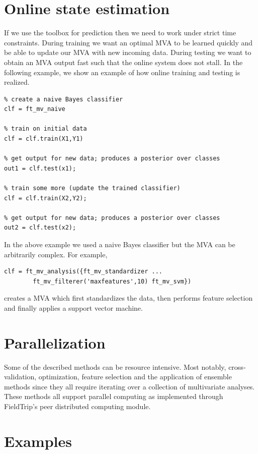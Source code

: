\documentclass{article}
\begin{document}


\section{Online state estimation}

If we use the toolbox for prediction then we need to work under strict time constraints. During training we want an optimal MVA to be learned quickly and be able to update our MVA with new incoming data. During testing we want to obtain an MVA output fast such that the online system does not stall. In the following example, we show an example of how online training and testing is realized.
\begin{verbatim}
% create a naive Bayes classifier
clf = ft_mv_naive

% train on initial data
clf = clf.train(X1,Y1)

% get output for new data; produces a posterior over classes
out1 = clf.test(x1);

% train some more (update the trained classifier)
clf = clf.train(X2,Y2);

% get output for new data; produces a posterior over classes
out2 = clf.test(x2);
\end{verbatim}
In the above example we used a naive Bayes classifier but the MVA can be arbitrarily complex. For example, 
\begin{verbatim}
clf = ft_mv_analysis({ft_mv_standardizer ...
        ft_mv_filterer('maxfeatures',10) ft_mv_svm})
\end{verbatim}
creates a MVA which first standardizes the data, then performs feature selection and finally applies a support vector machine.

\section{Parallelization}
\label{parallel}

Some of the described methods can be resource intensive. Most notably, cross-validation, optimization, feature selection and the application of ensemble methods since they all require iterating over a collection of multivariate analyses. These methods all support parallel computing as implemented through FieldTrip's peer distributed computing module.


\section{Examples}
\label{examples}
\end{document}
